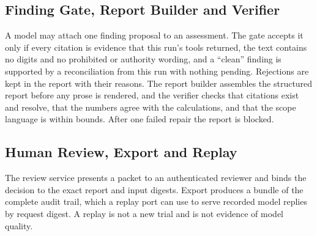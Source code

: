 \subsection{Finding Gate, Report Builder and Verifier}
A model may attach one finding proposal to an assessment. The gate accepts it only if every citation is
evidence that this run's tools returned, the text contains no digits and no prohibited or authority wording,
and a ``clean'' finding is supported by a reconciliation from this run with nothing pending. Rejections are kept
in the report with their reasons. The report builder assembles the structured report before any prose is
rendered, and the verifier checks that citations exist and resolve, that the numbers agree with the
calculations, and that the scope language is within bounds. After one failed repair the report is blocked.

\subsection{Human Review, Export and Replay}
The review service presents a packet to an authenticated reviewer and binds the decision to the exact report
and input digests. Export produces a bundle of the complete audit trail, which a replay port can use to
serve recorded model replies by request digest. A replay is not a new trial and is not evidence of model
quality.

